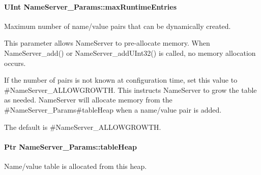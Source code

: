 \paragraph[{max\-Runtime\-Entries}]{\setlength{\rightskip}{0pt plus 5cm}U\-Int Name\-Server\-\_\-\-Params\-::max\-Runtime\-Entries}\label{struct_name_server___params_a26ee68e20b559b4c238c1e5a8646191f}
Maximum number of name/value pairs that can be dynamically created. \begin{DoxyVerb}   This parameter allows NameServer to pre-allocate memory. 
   When NameServer_add() or NameServer_addUInt32() is
   called, no memory allocation occurs.

   If the number of pairs is not known at configuration time, set this
   value to #NameServer_ALLOWGROWTH. This instructs NameServer 
   to grow the table as needed. NameServer will allocate memory from the 
   #NameServer_Params#tableHeap when a name/value pair is added.

   The default is #NameServer_ALLOWGROWTH.\end{DoxyVerb}
\paragraph[{table\-Heap}]{\setlength{\rightskip}{0pt plus 5cm}Ptr Name\-Server\-\_\-\-Params\-::table\-Heap}\label{struct_name_server___params_ac9c03b5c29cfe0507d2015c08253f69d}
Name/value table is allocated from this heap. 
